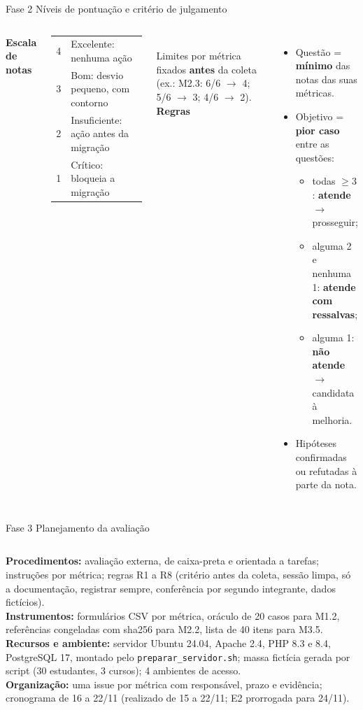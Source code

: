 \documentclass[aspectratio=169,10pt]{beamer}
\begin{document}
\begin{frame}{Fase 2 \textperiodcentered{} Níveis de pontuação e critério de julgamento}
\begin{columns}[T]
\textbf{Escala de notas}\\[0.3em]
\small
\begin{tabular}{@{}cl@{}}
\toprule
4 & Excelente: nenhuma ação \\
3 & Bom: desvio pequeno, com contorno \\
2 & Insuficiente: ação antes da migração \\
1 & Crítico: bloqueia a migração \\
\bottomrule
\end{tabular}\\[0.6em]
Limites por métrica fixados \textbf{antes} da coleta (ex.: M2.3: 6/6 $\rightarrow$ 4; 5/6 $\rightarrow$ 3; 4/6 $\rightarrow$ 2).
\textbf{Regras}
\begin{itemize}\small
\item Questão = \textbf{mínimo} das notas das suas métricas.
\item Objetivo = \textbf{pior caso} entre as questões:
  \begin{itemize}\scriptsize
  \item todas $\geq 3$: \textbf{atende} $\rightarrow$ prosseguir;
  \item alguma 2 e nenhuma 1: \textbf{atende com ressalvas};
  \item alguma 1: \textbf{não atende} $\rightarrow$ candidata à melhoria.
  \end{itemize}
\item Hipóteses confirmadas ou refutadas à parte da nota.
\end{itemize}
\end{columns}
\end{frame}

\begin{frame}{Fase 3 \textperiodcentered{} Planejamento da avaliação}
\small
\begin{columns}[T]
\textbf{Procedimentos:} avaliação externa, de caixa-preta e orientada a tarefas; instruções por métrica; regras R1 a R8 (critério antes da coleta, sessão limpa, só a documentação, registrar sempre, conferência por segundo integrante, dados fictícios).\\[0.5em]
\textbf{Instrumentos:} formulários CSV por métrica, oráculo de 20 casos para M1.2, referências congeladas com sha256 para M2.2, lista de 40 itens para M3.5.
\textbf{Recursos e ambiente:} servidor Ubuntu 24.04, Apache 2.4, PHP 8.3 e 8.4, PostgreSQL 17, montado pelo \texttt{preparar\_servidor.sh}; massa fictícia gerada por script (30 estudantes, 3 cursos); 4 ambientes de acesso.\\[0.5em]
\textbf{Organização:} uma issue por métrica com responsável, prazo e evidência; cronograma de 16 a 22/11 (realizado de 15 a 22/11; E2 prorrogada para 24/11).
\end{columns}
\end{frame}
\end{document}
